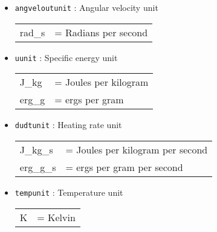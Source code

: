 \documentclass[a4paper]{article}
\newcommand{\var}[1]{\texttt{#1}}
\begin{document}
\begin{itemize}
\item \var{angveloutunit} : Angular velocity unit \\
\begin{tabular}{ll}
rad\_s & = Radians per second
\end{tabular}






\item \var{uunit} : Specific energy unit \\
\begin{tabular}{ll}
J\_kg  & = Joules per kilogram \\
erg\_g & = ergs per gram
\end{tabular}


\item \var{dudtunit} : Heating rate unit \\
\begin{tabular}{ll}
J\_kg\_s  & = Joules per kilogram per second \\
erg\_g\_s & = ergs per gram per second
\end{tabular}

\item \var{tempunit} : Temperature unit \\
\begin{tabular}{ll}
K & = Kelvin
\end{tabular}

\end{itemize}
\end{document}
